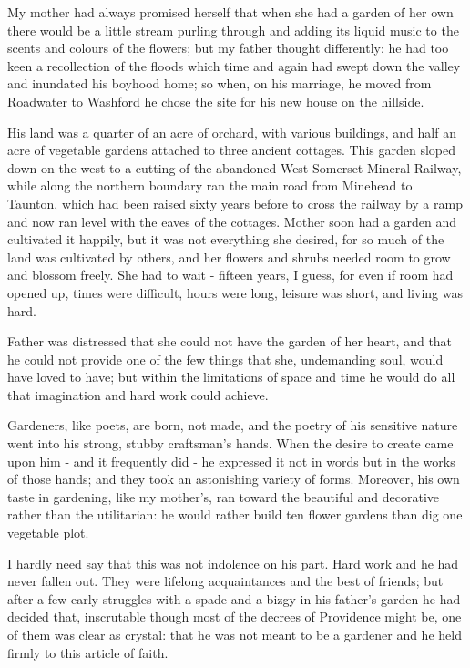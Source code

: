 
My mother had always promised herself that when she had a garden of her own there would be a little stream purling through and adding its liquid music to the scents and colours of the flowers; but my father thought differently: he had too keen a recollection of the floods which time and again had swept down the valley and inundated his boyhood home; so when, on his marriage, he moved from Roadwater to Washford he chose the site for his new house on the hillside.

His land was a quarter of an acre of orchard, with various buildings, and half an acre of vegetable gardens attached to three ancient cottages. This garden sloped down on the west to a cutting of the abandoned West Somerset Mineral Railway, while along the northern boundary ran the main road from Minehead to Taunton, which had been raised sixty years before to cross the railway by a ramp and now ran level with the eaves of the cottages. Mother soon had a garden and cultivated it happily, but it was not everything she desired, for so much of the land was cultivated by others, and her flowers and shrubs needed room to grow and blossom freely. She had to wait - fifteen years, I guess, for even if room had opened up, times were difficult, hours were long, leisure was short, and living was hard.

Father was distressed that she could not have the garden of her heart, and that he could not provide one of the few things that she, undemanding soul, would have loved to have; but within the limitations of space and time he would do all that imagination and hard work could achieve. 

Gardeners, like poets, are born, not made, and the poetry of his sensitive nature went into his strong, stubby craftsman's hands. When the desire to create came upon him - and it frequently did - he expressed it not in words but in the works of those hands; and they took an astonishing variety of forms. Moreover, his own taste in gardening, like my mother's, ran toward the beautiful and decorative rather than the utilitarian: he would rather build ten flower gardens than dig one vegetable plot.

I hardly need say that this was not indolence on his part. Hard work and he had never fallen out. They were lifelong acquaintances and the best of friends; but after a few early struggles with a spade and a bizgy in his father's garden he had decided that, inscrutable though most of the decrees of Providence might be, one of them was clear as crystal: that he was not meant to be a gardener and he held firmly to this article of faith.

